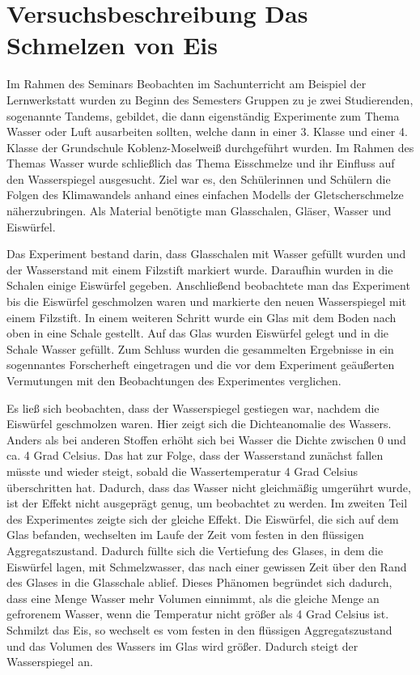 \section{Versuchsbeschreibung \glqq Das Schmelzen von Eis\grqq{}}
Im Rahmen des Seminars \glqq Beobachten im Sachunterricht am Beispiel der Lernwerkstatt\grqq{} wurden zu Beginn des Semesters Gruppen zu je zwei Studierenden, sogenannte Tandems, gebildet, die dann eigenständig Experimente zum Thema \glqq Wasser\grqq{} oder \glqq Luft\grqq{} ausarbeiten sollten, welche dann in einer 3. Klasse und einer 4. Klasse der Grundschule Koblenz-Moselweiß durchgeführt wurden.
Im Rahmen des Themas \glqq Wasser\grqq{} wurde schließlich das Thema \glqq Eisschmelze und ihr Einfluss auf den Wasserspiegel\grqq{} ausgesucht.
Ziel war es, den Schülerinnen und Schülern die Folgen des Klimawandels anhand eines einfachen Modells der Gletscherschmelze näherzubringen.
Als Material benötigte man Glasschalen, Gläser, Wasser und Eiswürfel.

Das Experiment bestand darin, dass Glasschalen mit Wasser gefüllt wurden und der Wasserstand mit einem Filzstift markiert wurde.
Daraufhin wurden in die Schalen einige Eiswürfel gegeben.
Anschließend beobachtete man das Experiment bis die Eiswürfel geschmolzen waren und markierte den neuen Wasserspiegel mit einem Filzstift.
In einem weiteren Schritt wurde ein Glas mit dem Boden nach oben in eine Schale gestellt.
Auf das Glas wurden Eiswürfel gelegt und in die Schale Wasser gefüllt.
Zum Schluss wurden die gesammelten Ergebnisse in ein sogennantes \glqq Forscherheft\grqq{} eingetragen und die vor dem Experiment geäußerten Vermutungen mit den Beobachtungen des Experimentes verglichen.

Es ließ sich beobachten, dass der Wasserspiegel gestiegen war, nachdem die Eiswürfel geschmolzen waren.
Hier zeigt sich die Dichteanomalie des Wassers.
Anders als bei anderen Stoffen erhöht sich bei Wasser die Dichte zwischen 0 und ca. 4 Grad Celsius.
Das hat zur Folge, dass der Wasserstand zunächst fallen müsste und wieder steigt, sobald die Wassertemperatur 4 Grad Celsius überschritten hat.
Dadurch, dass das Wasser nicht gleichmäßig umgerührt wurde, ist der Effekt nicht ausgeprägt genug, um beobachtet zu werden.
Im zweiten Teil des Experimentes zeigte sich der gleiche Effekt.
Die Eiswürfel, die sich auf dem Glas befanden, wechselten im Laufe der Zeit vom festen in den flüssigen Aggregatszustand.
Dadurch füllte sich die Vertiefung des Glases, in dem die Eiswürfel lagen, mit Schmelzwasser, das nach einer gewissen Zeit über den Rand des Glases in die Glasschale ablief.
Dieses Phänomen begründet sich dadurch, dass eine Menge Wasser mehr Volumen einnimmt, als die gleiche Menge an gefrorenem Wasser, wenn die Temperatur nicht größer als 4 Grad Celsius ist.
Schmilzt das Eis, so wechselt es vom festen in den flüssigen Aggregatszustand und das Volumen des Wassers im Glas wird größer.
Dadurch steigt der Wasserspiegel an.

